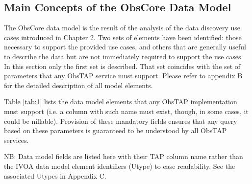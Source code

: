 \documentclass[11pt,a4paper]{ivoa}
\begin{document}
\subsection[Main Concepts of the ObsCore Data Model]{Main Concepts of the ObsCore Data Model}
The ObsCore data model is the result of the analysis of the data discovery use cases introduced in Chapter 2. Two sets
of elements have been identified: those necessary to support the provided use cases, and others that are generally
useful to describe the data but are not immediately required to support the use cases.  In this section only the first
set is described.  That set coincides with the set of parameters that any ObsTAP service must support. Please refer to
appendix B for the detailed description of all model elements.

Table \ref{tab:1} lists the data model elements that any ObsTAP implementation must support (i.e. a column with such name must
exist, though, in some cases, it could be nillable).  Provision of these mandatory fields ensures that any query based
on these parameters is guaranteed to be understood by all ObsTAP services.


NB: Data model fields are listed here with their TAP column name rather than the IVOA data model element identifiers
(Utype) to ease readability.  See the associated Utypes in Appendix C.
\end{document}
